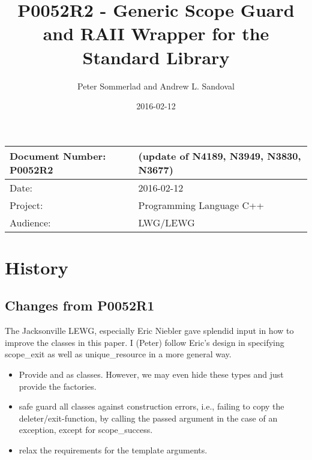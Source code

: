 \documentclass[ebook,11pt,article]{memoir}
\title{P0052R2 - Generic Scope Guard and RAII Wrapper for the Standard Library}
\author{Peter Sommerlad and Andrew L. Sandoval}
\date{2016-02-12}                        %
\begin{document}
\maketitle
\begin{tabular}[t]{|l|l|}\hline 
Document Number: P0052R2 &   (update of N4189, N3949, N3830, N3677)\\\hline
Date: & 2016-02-12 \\\hline
Project: & Programming Language C++\\\hline 
Audience: & LWG/LEWG\\\hline
\end{tabular}

\chapter{History}
\section{Changes from P0052R1}
The Jacksonville LEWG, especially Eric Niebler gave splendid input in how to improve the classes in this paper. I (Peter) follow Eric's design in specifying scope_exit as well as unique_resource in a more general way.
\begin{itemize}
\item Provide  and  as classes. However, we may even hide these types and just provide the factories.
\item safe guard all classes against construction errors, i.e., failing to copy the deleter/exit-function, by calling the passed argument in the case of an exception, except for scope_success.
\item relax the requirements for the template arguments.
\end{itemize}
\end{document}

